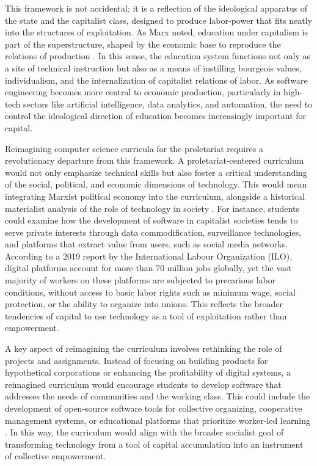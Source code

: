 \begin{refsection}
This framework is not accidental; it is a reflection of the ideological apparatus of the state and the capitalist class, designed to produce labor-power that fits neatly into the structures of exploitation. As Marx noted, education under capitalism is part of the superstructure, shaped by the economic base to reproduce the relations of production \cite[pp.~33]{marx1959manifesto}. In this sense, the education system functions not only as a site of technical instruction but also as a means of instilling bourgeois values, individualism, and the internalization of capitalist relations of labor. As software engineering becomes more central to economic production, particularly in high-tech sectors like artificial intelligence, data analytics, and automation, the need to control the ideological direction of education becomes increasingly important for capital.

Reimagining computer science curricula for the proletariat requires a revolutionary departure from this framework. A proletariat-centered curriculum would not only emphasize technical skills but also foster a critical understanding of the social, political, and economic dimensions of technology. This would mean integrating Marxist political economy into the curriculum, alongside a historical materialist analysis of the role of technology in society \cite[pp.~104]{engels1987condition}. For instance, students could examine how the development of software in capitalist societies tends to serve private interests through data commodification, surveillance technologies, and platforms that extract value from users, such as social media networks. According to a 2019 report by the International Labour Organization (ILO), digital platforms account for more than 70 million jobs globally, yet the vast majority of workers on these platforms are subjected to precarious labor conditions, without access to basic labor rights such as minimum wage, social protection, or the ability to organize into unions. This reflects the broader tendencies of capital to use technology as a tool of exploitation rather than empowerment.

A key aspect of reimagining the curriculum involves rethinking the role of projects and assignments. Instead of focusing on building products for hypothetical corporations or enhancing the profitability of digital systems, a reimagined curriculum would encourage students to develop software that addresses the needs of communities and the working class. This could include the development of open-source software tools for collective organizing, cooperative management systems, or educational platforms that prioritize worker-led learning \cite[pp.~202]{marx2008capital}. In this way, the curriculum would align with the broader socialist goal of transforming technology from a tool of capital accumulation into an instrument of collective empowerment.


\end{refsection}
